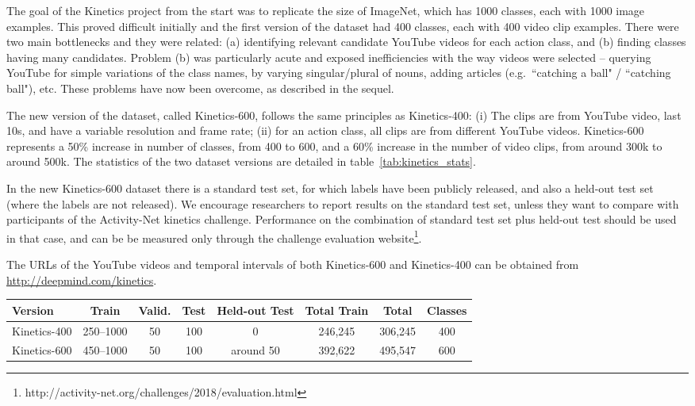 \documentclass[10pt,twocolumn,letterpaper]{article}
\begin{document}
The goal of the Kinetics project from the start was to replicate the size of ImageNet, which has 1000 classes, each with 1000 image examples.  This proved difficult initially and the first version of the dataset had 400 classes, each with 400 video clip examples. There were two main bottlenecks and they were related: (a) identifying relevant candidate YouTube videos for each action class, and (b) finding classes having many candidates. Problem (b) was particularly acute and exposed inefficiencies with the way videos were selected -- querying YouTube for simple variations of the class names, by varying singular/plural of nouns, adding articles (e.g.\ ``catching a ball" / ``catching ball"), etc. These problems have now been overcome, as described in the sequel.

The new version of the dataset, called Kinetics-600, follows the same principles as Kinetics-400:
(i) The clips are from YouTube video, last 10s,  and have a variable resolution and frame rate; (ii) for an action class, all clips are from different YouTube videos.
 Kinetics-600 represents a 50\% increase in number of classes, from 400 to 600,  and a 60\% increase in the number of video clips,
from around 300k to around 500k. The statistics of the two dataset versions are detailed in table~\ref{tab:kinetics_stats}.

In the new Kinetics-600 dataset there is a standard test set, for which labels have been publicly released, and also
 a held-out test set (where the labels are not released).
We encourage researchers to report results on the standard test set, unless they want to compare with participants of the Activity-Net kinetics challenge. Performance on the combination of standard test set plus held-out test should be used in that case, and can be be measured only through the challenge evaluation website\footnote{http://activity-net.org/challenges/2018/evaluation.html}.

The URLs of the YouTube videos and temporal intervals of both Kinetics-600 and Kinetics-400 can be obtained from \url{http://deepmind.com/kinetics}.

\begin{table*}[ht]
\centering
\begin{tabular}{| l || c | c | c | c || c | c | c | }
  \hline
  \textbf{Version} & \textbf{Train} & \textbf{Valid.} & \textbf{Test} & \textbf{Held-out Test} & \textbf{Total Train} & \textbf{Total} & {\textbf{Classes}}  \\ \hline 
Kinetics-400 \cite{kay2017kinetics} & 250--1000 & 50  & 100 & 0  & 246,245 & 306,245 & 400 \\ \hline
Kinetics-600 & 450--1000 & 50  & 100 & around 50 & 392,622 & 495,547 & 600 \\  \hline
\end{tabular} 
\vspace{5pt}
\caption{Kinetics Dataset Statistics. The number of clips for each class in the various splits (left), and the totals (right). With Kinetics-600 we have released the ground truth test set labels, and also created an additional held-out test set for the purpose of the Activity-Net Challenge. }
\label{tab:kinetics_stats}
\end{table*}
\end{document}

